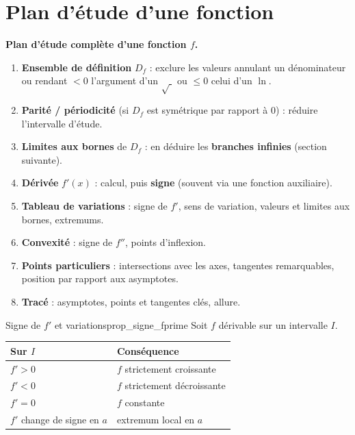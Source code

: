 \section{Plan d'étude d'une fonction}

\begin{methode}
	\textbf{Plan d'étude complète d'une fonction $f$.}
	\begin{enumerate}
		\item \textbf{Ensemble de définition} $D_f$ : exclure les valeurs
		annulant un dénominateur ou rendant $<0$ l'argument d'un $\sqrt{\;}$ ou
		$\leq 0$ celui d'un $\ln$.
		\item \textbf{Parité / périodicité} (si $D_f$ est symétrique par rapport
		à $0$) : réduire l'intervalle d'étude.
		\item \textbf{Limites aux bornes} de $D_f$ : en déduire les
		\textbf{branches infinies} (section suivante).
		\item \textbf{Dérivée} $f'(x)$ : calcul, puis \textbf{signe} (souvent via
		une fonction auxiliaire).
		\item \textbf{Tableau de variations} : signe de $f'$, sens de variation,
		valeurs et limites aux bornes, extremums.
		\item \textbf{Convexité} : signe de $f''$, points d'inflexion.
		\item \textbf{Points particuliers} : intersections avec les axes,
		tangentes remarquables, position par rapport aux asymptotes.
		\item \textbf{Tracé} : asymptotes, points et tangentes clés, allure.
	\end{enumerate}
\end{methode}

\begin{propriete}{Signe de $f'$ et variations}{prop_signe_fprime}
	Soit $f$ dérivable sur un intervalle $I$.
	\begin{center}
	\renewcommand{\arraystretch}{1.5}
	\begin{tabular}{>{\centering\arraybackslash}p{4.6cm}
	                >{\centering\arraybackslash}p{4.2cm}}
	\hline
	\textbf{Sur $I$} & \textbf{Conséquence} \\
	\hline
	$f'>0$          & $f$ strictement croissante \\
	$f'<0$          & $f$ strictement décroissante \\
	$f'=0$          & $f$ constante \\
	$f'$ change de signe en $a$ & extremum local en $a$ \\
	\hline
	\end{tabular}
	\end{center}
\end{propriete}

